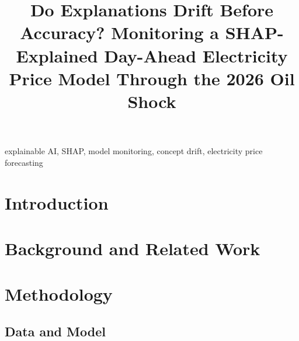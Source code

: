 \documentclass[conference]{IEEEtran}
\begin{document}
\title{Do Explanations Drift Before Accuracy? Monitoring a SHAP-Explained
Day-Ahead Electricity Price Model Through the 2026 Oil Shock}

\author{
\and
{}
\and
{}
\and
{}
}

\maketitle

\begin{abstract}

\end{abstract}

\begin{IEEEkeywords}
explainable AI, SHAP, model monitoring, concept drift, electricity price forecasting
\end{IEEEkeywords}

\section{Introduction}


\section{Background and Related Work}


\section{Methodology}
\subsection{Data and Model}

\end{document}
